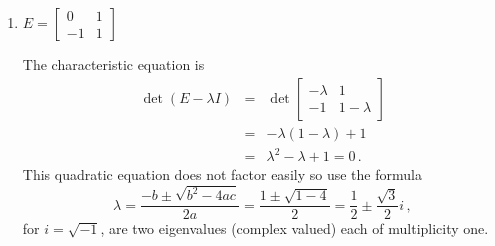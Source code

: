 \begin{example}
\begin{enumerate}
\item \(E=\begin{bmatrix} 0&1\\-1&1 \end{bmatrix}\)
\begin{solution} 
The characteristic equation is
\begin{eqnarray*}
\det(E-\lambda I)
&=&\det\begin{bmatrix} -\lambda&1\\-1&1-\lambda \end{bmatrix}
\\&=&-\lambda(1-\lambda)+1
\\&=&\lambda^2-\lambda+1=0\,.
\end{eqnarray*}
This quadratic equation does not factor easily so use the formula 
\begin{equation*}
\lambda=\frac{-b\pm\sqrt{b^2-4ac}}{2a}
=\frac{1\pm\sqrt{1-4}}{2}
=\frac12\pm\frac{\sqrt3}2i\,,
\end{equation*}
for \(i=\sqrt{-1}\), are two eigenvalues (complex valued) each of multiplicity one.
\end{solution}

\end{enumerate}
\end{example}




